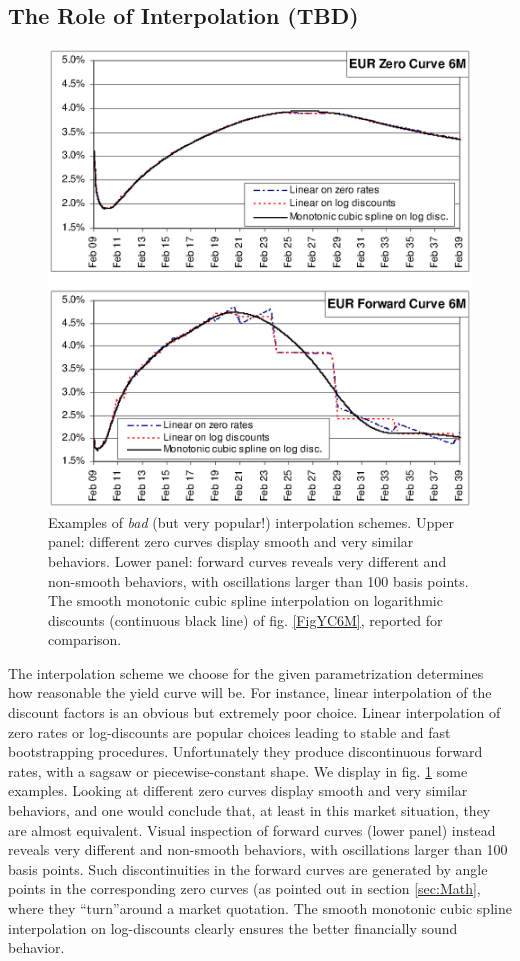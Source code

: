 \documentclass[11pt,reqno]{amsart}
\begin{document}
\subsection{\label{sec:Interp}The Role of Interpolation (TBD)}
\begin{figure}[tbp]
\centering
\includegraphics[scale=0.7]{../figures/FigInterpolations}
\caption{Examples of \emph{bad} (but very popular!) interpolation schemes. Upper panel: different zero curves display smooth and very similar behaviors. Lower panel: forward curves reveals very different and non-smooth behaviors, with oscillations larger than 100 basis points. The smooth monotonic cubic spline interpolation on logarithmic discounts (continuous black line) of fig. \ref{FigYC6M}, reported for comparison.}
\label{fig:Interpolations}
\end{figure}
The interpolation scheme we choose for the given parametrization determines how reasonable the yield curve will be. For instance, linear interpolation of the discount factors is an obvious but extremely poor choice. Linear interpolation of zero rates or log-discounts are popular choices leading to stable and fast bootstrapping procedures. Unfortunately they produce discontinuous forward rates, with a sagsaw or piecewise-constant shape. We display in fig. \ref{fig:Interpolations} some examples. Looking at different zero curves display smooth and very similar behaviors, and one would conclude that, at least in this market situation, they are almost equivalent. Visual inspection of forward curves (lower panel) instead reveals very different and non-smooth behaviors, with oscillations larger than 100 basis points.
Such discontinuities in the forward curves are generated by angle points in the corresponding zero curves (as pointed out in section \ref{sec:Math}, where they \textquotedblleft turn\textquotedblright around a market quotation.
The smooth monotonic cubic spline interpolation on log-discounts clearly ensures the better financially sound behavior.
\end{document}

